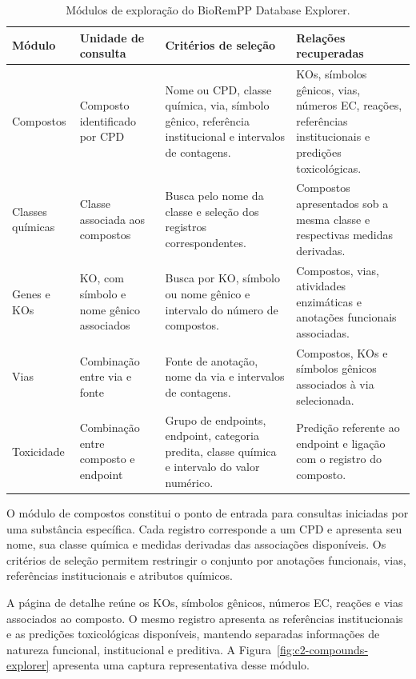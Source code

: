 \begin{table}[htbp]
\centering
\caption{Módulos de exploração do BioRemPP Database Explorer.}
\label{tab:c2-explorer-modules}
\footnotesize
\begin{tabularx}{\textwidth}{
    @{}
    p{2.4cm}
    p{2.8cm}
    p{4.7cm}
    X
    @{}
}
\toprule
\textbf{Módulo}
& \textbf{Unidade de consulta}
& \textbf{Critérios de seleção}
& \textbf{Relações recuperadas} \\
\midrule

Compostos
& Composto identificado por CPD
& Nome ou CPD, classe química, via, símbolo gênico, referência institucional
e intervalos de contagens.
& KOs, símbolos gênicos, vias, números EC, reações, referências
institucionais e predições toxicológicas. \\

Classes químicas
& Classe associada aos compostos
& Busca pelo nome da classe e seleção dos registros correspondentes.
& Compostos apresentados sob a mesma classe e respectivas medidas derivadas. \\

Genes e KOs
& KO, com símbolo e nome gênico associados
& Busca por KO, símbolo ou nome gênico e intervalo do número de compostos.
& Compostos, vias, atividades enzimáticas e anotações funcionais associadas. \\

Vias
& Combinação entre via e fonte
& Fonte de anotação, nome da via e intervalos de contagens.
& Compostos, KOs e símbolos gênicos associados à via selecionada. \\

Toxicidade
& Combinação entre composto e endpoint
& Grupo de endpoints, endpoint, categoria predita, classe química e intervalo
do valor numérico.
& Predição referente ao endpoint e ligação com o registro do composto. \\

\bottomrule
\end{tabularx}
\end{table}

O módulo de compostos constitui o ponto de entrada para consultas iniciadas
por uma substância específica. Cada registro corresponde a um CPD e apresenta
seu nome, sua classe química e medidas derivadas das associações disponíveis.
Os critérios de seleção permitem restringir o conjunto por anotações
funcionais, vias, referências institucionais e atributos químicos.

A página de detalhe reúne os KOs, símbolos gênicos, números EC, reações e vias
associados ao composto. O mesmo registro apresenta as referências
institucionais e as predições toxicológicas disponíveis, mantendo separadas
informações de natureza funcional, institucional e preditiva. A
Figura~\ref{fig:c2-compounds-explorer} apresenta uma captura representativa
desse módulo.

